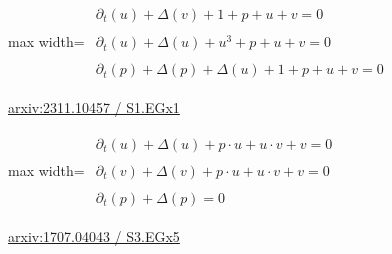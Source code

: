 \documentclass[10pt,a4paper]{article}
\begin{document}
\begin{minipage}{\linewidth}
\begin{center}\begin{adjustbox}{max width=\linewidth}$\displaystyle\begin{gathered}\begin{gathered}\partial_{t}(u)+\Delta(v)+1+p+u+v=0\end{gathered}\\[5pt]\begin{gathered}\partial_{t}(u)+\Delta(u)+u^{3}+p+u+v=0\end{gathered}\\[5pt]\begin{gathered}\partial_{t}(p)+\Delta(p)+\Delta(u)+1+p+u+v=0\end{gathered}\end{gathered}$\end{adjustbox}\end{center}
{\small \href{https://arxiv.org/html/2311.10457#S1.EGx1}{arxiv:2311.10457 / S1.EGx1}}\par
\end{minipage}\par\vspace{7mm}

\begin{minipage}{\linewidth}
\begin{center}\begin{adjustbox}{max width=\linewidth}$\displaystyle\begin{gathered}\begin{gathered}\partial_{t}(u)+\Delta(u)+p\cdot u+u\cdot v+v=0\end{gathered}\\[5pt]\begin{gathered}\partial_{t}(v)+\Delta(v)+p\cdot u+u\cdot v+v=0\end{gathered}\\[5pt]\begin{gathered}\partial_{t}(p)+\Delta(p)=0\end{gathered}\end{gathered}$\end{adjustbox}\end{center}
{\small \href{https://arxiv.org/html/1707.04043#S3.EGx5}{arxiv:1707.04043 / S3.EGx5}}\par
\end{minipage}\par\vspace{7mm}
\end{document}
